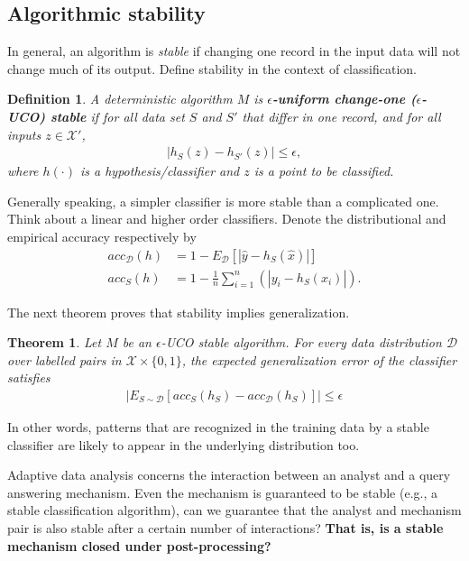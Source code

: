 \documentclass[]{article}
\newtheorem{theorem}{Theorem}[section]
\newtheorem{definition}{Definition}[section] %
\begin{document}
\subsection{Algorithmic stability}

In general, an algorithm is \textit{stable} if changing one record in the input data will not change much of its output. Define stability in the context of classification. 
\begin{definition}
	A deterministic algorithm $M$ is \textbf{$\epsilon$-uniform change-one ($\epsilon$-UCO) stable} if for all data set $S$ and $S'$ that differ in one record, and for all inputs $z \in \mathcal{X}'$, 
	\begin{align*}
		|h_S(z) - h_{S'}(z)| \le \epsilon,
	\end{align*}
	where $h(\cdot)$ is a hypothesis/classifier and $z$ is a point to be classified.
\end{definition}

Generally speaking, a simpler classifier is more stable than a complicated one. Think about a linear and higher order classifiers. Denote the distributional and empirical accuracy respectively by 
\begin{align*}
	acc_{\mathcal{D}}(h) &= 1 - E_{\mathcal{D}}[|\hat{y}-h_S(\hat{x})|] \\
	acc_{S}(h) &= 1 - \frac{1}{n}\sum_{i=1}^{n}(|y_i-h_S(x_i)|).
\end{align*}

The next theorem proves that stability implies generalization. 
\begin{theorem}
	Let $M$ be an $\epsilon$-UCO stable algorithm. For every data distribution $\mathcal{D}$ over labelled pairs in $\mathcal{X} \times \{0,1\}$, the expected generalization error of the classifier satisfies 
	\begin{align*}
		\left|E_{S \sim \mathcal{D}}[acc_S(h_S) - acc_{\mathcal{D}}(h_S)] \right| \le \epsilon
	\end{align*} 
\end{theorem}

In other words, patterns that are recognized in the training data by a stable classifier are likely to appear in the underlying distribution too. 

Adaptive data analysis concerns the interaction between an analyst and a query answering mechanism. Even the mechanism is guaranteed to be stable (e.g., a stable classification algorithm), can we guarantee that the analyst and mechanism pair is also stable after a certain number of interactions? \textbf{That is, is a stable mechanism closed under post-processing?  }
\end{document}
